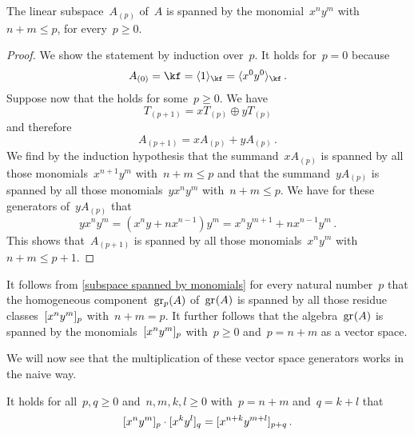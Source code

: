 \begin{lemma}
  \label{subspace spanned by monomials}
  The linear subspace~$A_{(p)}$ of~$A$ is spanned by the monomial~$x^n y^m$ with~$n + m \leq p$, for every~$p \geq 0$.
\end{lemma}
  

\begin{proof}
  We show the statement by induction over~$p$.
  It holds for~$p = 0$ because
  \[
    A_{(0)}
    =
    \kf
    =
    \gen{1}_{\kf}
    =
    \gen{x^0 y^0}_{\kf} \,.
  \]
  Suppose now that the  holds for some~$p \geq 0$.
  We have
  \[
    T_{(p+1)}
    =
    x T_{(p)} \oplus y T_{(p)}
  \]
  and therefore
  \[
    A_{(p+1)}
    =
    x A_{(p)} + y A_{(p)} \,.
  \]
  We find by the induction hypothesis that the summand~$x A_{(p)}$ is spanned by all those monomials~$x^{n+1} y^m$ with~$n+m \leq p$ and that the summand~$y A_{(p)}$ is spanned by all those monomials~$y x^n y^m$ with~$n + m \leq p$.
  We have for these generators of~$y A_{(p)}$ that
  \[
    y x^n y^m
    =
    (x^n y + n x^{n-1}) y^m
    =
    x^n y^{m+1} + n x^{n-1} y^m \,.
  \]
  This shows that~$A_{(p+1)}$ is spanned by all those monomials~$x^n y^m$ with~$n+m \leq p+1$.
\end{proof}
 
\begin{fluff}
  It follows from \cref{subspace spanned by monomials} for every natural number~$p$ that the homogeneous component~$\gr[p](A)$ of~$\gr(A)$ is spanned by all those residue classes~$\lbrack x^n y^m \rbrack_p$ with~$n + m = p$.
  It further follows that the algebra~$\gr(A)$ is spanned by the monomials~$\lbrack x^n y^m \rbrack_p$ with~$p \geq 0$ and~$p = n + m$ as a vector space.

  We will now see that the multiplication of these vector space generators works in the naive way.
\end{fluff}
  
\begin{lemma}
  \label{generators commute for weyl}
  It holds for all~$p, q \geq 0$ and~$n, m, k, l \geq 0$ with~$p = n+m$ and~$q = k+l$ that
  \[
    \lbrack x^n y^m \rbrack_p \cdot \lbrack x^k y^l \rbrack_q
    =
    \lbrack x^{n+k} y^{m+l} \rbrack_{p+q} \,.
  \]
\end{lemma}
  
